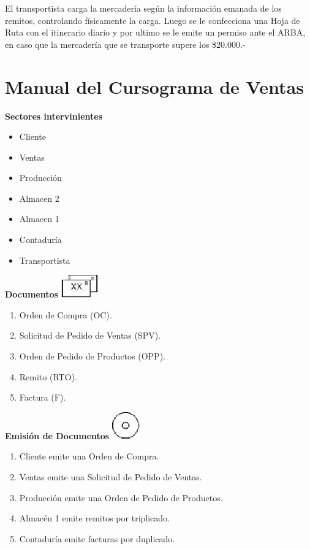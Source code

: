 \begin{description}
	El transportista carga la mercader\'ia seg\'un la información emanada de los remitos, controlando f\'isicamente la carga.  Luego se le confecciona una Hoja de Ruta con el itinerario diario y por ultimo se le emite un permiso ante el ARBA, en caso que la mercader\'ia que se transporte supere los \$20.000.-   
\end{description}

\pagebreak
\section{Manual del Cursograma de Ventas}

\begin{center}\textbf{Sectores intervinientes}\end{center}
\begin{itemize}
  \item Cliente
  \item Ventas
  \item Producción
  \item Almacen 2
  \item Almacen 1
  \item Contaduría
  \item Transportista
\end{itemize}

\begin{center}
  \textbf{Documentos}
  \includegraphics{./Images/Simbolos/simbolo-Documentos.png}
\end{center}
\begin{enumerate}
  \item Orden de Compra (OC).
  \item Solicitud de Pedido de Ventas (SPV).
  \item Orden de Pedido de Productos (OPP).
  \item Remito (RTO).
  \item Factura (F).
\end{enumerate}

\begin{center}
  \textbf{Emisión de Documentos}
  \includegraphics{./Images/Simbolos/simbolo-Emision-de-Documentos.png}
\end{center}
\begin{enumerate}
  \item Cliente emite una Orden de Compra.
  \item Ventas emite una Solicitud de Pedido de Ventas. 
  \item Producción emite una Orden de Pedido de Productos.
  \item Almacén 1 emite remitos por triplicado.
  \item Contaduría emite facturas por duplicado.
\end{enumerate}


